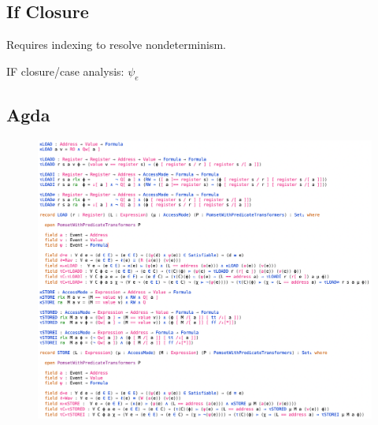 \subsection{If Closure}
Requires indexing to resolve nondeterminism.

IF closure/case analysis: $\psi_e$


\subsection{Agda}

\begin{figure}
  \includegraphics[width=\textwidth]{agda.png}
\end{figure}
